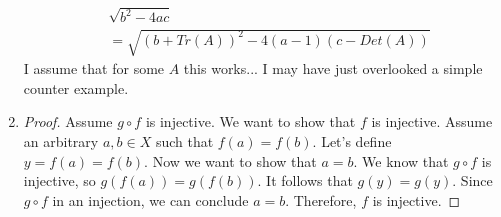 \documentclass{article}
\theoremstyle{problem}
\theoremstyle{plain}
\theoremstyle{remark}
\begin{document}
\begin{enumerate}
           \begin{align*}
             &  \displaystyle \sqrt{b^2 - 4ac}\\
             &= \displaystyle \sqrt{(b+Tr(A))^2 -4(a-1)(c-Det(A))}
           \end{align*}
I assume that for some $A$ this works... I may have just overlooked a simple counter example.
    \item \begin{proof}
        Assume $g \circ f$ is injective. 
        We want to show that $f$ is injective. 
        Assume an arbitrary $a,b \in X$ such that $f(a) = f(b)$. 
        Let's define $y = f(a) = f(b)$. 
        Now we want to show that $a = b$. 
        We know that $g \circ f$ is injective, so $g(f(a)) = g(f(b))$. 
        It follows that $g(y) = g(y)$. 
        Since $g \circ f$ in an injection, we can conclude $a = b$. 
        Therefore, $f$ is injective.
      \end{proof}
    \end{enumerate}
\end{document}
